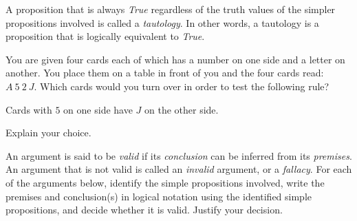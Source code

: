 \documentclass[addpoints]{exam}
\begin{document}
\begin{questions}
  
\question A proposition that is always \textit{True} regardless of the truth values of the simpler propositions involved is called a \textit{tautology}. In other words, a tautology is a proposition that is logically equivalent to \textit{True}.


\question[5] You are given four cards each of which has a number on one side and a letter on another. You place them on a table in front of you and the four cards read: $A\ 5\ 2\ J$. Which cards would you turn over in order to test the following rule? 
  \begin{center}
    Cards with $5$ on one side have $J$ on the other side.
  \end{center}
  Explain your choice.
  \begin{solution}
  \end{solution}
  
\question An argument is said to be \textit{valid} if its \textit{conclusion} can be inferred from its \textit{premises}. An argument that is not valid is called an \textit{invalid} argument, or a \textit{fallacy}. For each of the arguments below, identify the simple propositions involved, write the premises and conclusion(s) in logical notation using the identified simple propositions, and decide whether it is valid. Justify your decision.
  \begin{parts}

\end{parts}
\end{questions}
\end{document}
